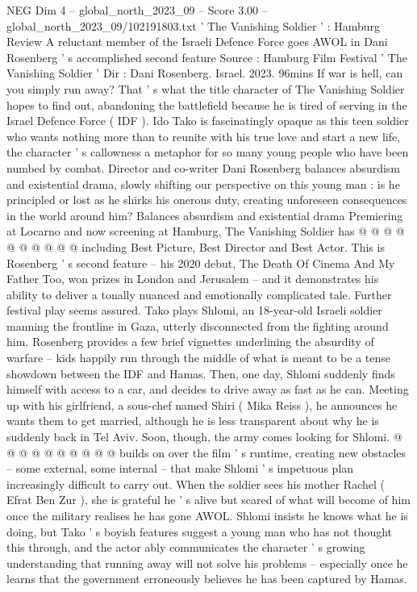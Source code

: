 \begin{textsample}{NEG Dim 4 – global\_north\_2023\_09 – Score 3.00 – global\_north\_2023\_09/102191803.txt}  \label{ex:f4_neg_050}
' The Vanishing Soldier ' : Hamburg Review A reluctant member of the Israeli Defence Force goes AWOL in Dani Rosenberg ' s accomplished second feature Source : Hamburg Film Festival ' The Vanishing Soldier ' Dir : Dani Rosenberg.
Israel. 2023. 96mins If war is hell, can you simply run away?
That ' s what the title character of The Vanishing Soldier hopes to find out, abandoning the battlefield because he is tired of serving in the Israel Defence Force ( IDF ).
Ido Tako is fascinatingly opaque as this teen soldier who wants nothing more than to reunite with his true love and start a new life, the character ' s callowness a metaphor for so many young people who have been numbed by combat.
Director and co-writer Dani Rosenberg balances absurdism and existential drama, slowly shifting our perspective on this young man : is he principled or lost as he shirks his onerous duty, creating unforeseen consequences in the world around him?
Balances absurdism and existential drama Premiering at Locarno and now screening at Hamburg, The Vanishing Soldier has @ @ @ @ @ @ @ @ @ @ including Best Picture, Best Director and Best Actor.
This is Rosenberg ' s second feature -- his 2020 debut, The Death Of Cinema And My Father Too, won prizes in London and Jerusalem -- and it demonstrates his ability to deliver a tonally nuanced and emotionally complicated tale.
Further festival play seems assured.
Tako plays Shlomi, an 18-year-old Israeli soldier manning the frontline in Gaza, utterly disconnected from the fighting around him.
Rosenberg provides a few brief vignettes underlining the absurdity of warfare -- kids happily run through the middle of what is meant to be a tense showdown between the IDF and Hamas.
Then, one day, Shlomi suddenly finds himself with access to a car, and decides to drive away as fast as he can.
Meeting up with his girlfriend, a sous-chef named Shiri ( Mika Reiss ), he announces he wants them to get married, although he is less transparent about why he is suddenly back in Tel Aviv.
Soon, though, the army comes looking for Shlomi. @ @ @ @ @ @ @ @ @ @ builds on over the film ' s runtime, creating new obstacles -- some external, some internal -- that make Shlomi ' s impetuous plan increasingly difficult to carry out.
When the soldier sees his mother Rachel ( Efrat Ben Zur ), she is grateful he ' s alive but scared of what will become of him once the military realises he has gone AWOL.
Shlomi insists he knows what he is doing, but Tako ' s boyish features suggest a young man who has not thought this through, and the actor ably communicates the character ' s growing understanding that running away will not solve his problems -- especially once he learns that the government erroneously believes he has been captured by Hamas.

\end{textsample}
